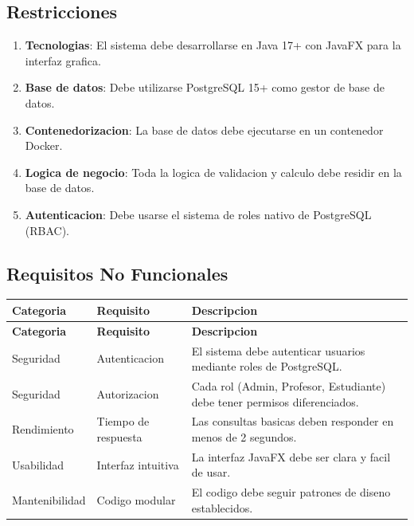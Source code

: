 \documentclass[12pt,a4paper]{article}
\begin{document}
\subsection{Restricciones}

\begin{enumerate}
    \item \textbf{Tecnologias}: El sistema debe desarrollarse en Java 17+ con JavaFX para la interfaz grafica.
    \item \textbf{Base de datos}: Debe utilizarse PostgreSQL 15+ como gestor de base de datos.
    \item \textbf{Contenedorizacion}: La base de datos debe ejecutarse en un contenedor Docker.
    \item \textbf{Logica de negocio}: Toda la logica de validacion y calculo debe residir en la base de datos.
    \item \textbf{Autenticacion}: Debe usarse el sistema de roles nativo de PostgreSQL (RBAC).
\end{enumerate}

\subsection{Requisitos No Funcionales}

\begin{longtable}{|p{3cm}|p{4cm}|p{7cm}|}
\hline
\rowcolor{udgreen!20}
\textbf{Categoria} & \textbf{Requisito} & \textbf{Descripcion} \\
\hline
\endfirsthead
\hline
\rowcolor{udgreen!20}
\textbf{Categoria} & \textbf{Requisito} & \textbf{Descripcion} \\
\hline
\endhead
Seguridad & Autenticacion & El sistema debe autenticar usuarios mediante roles de PostgreSQL. \\
\hline
Seguridad & Autorizacion & Cada rol (Admin, Profesor, Estudiante) debe tener permisos diferenciados. \\
\hline
Rendimiento & Tiempo de respuesta & Las consultas basicas deben responder en menos de 2 segundos. \\
\hline
Usabilidad & Interfaz intuitiva & La interfaz JavaFX debe ser clara y facil de usar. \\
\hline
Mantenibilidad & Codigo modular & El codigo debe seguir patrones de diseno establecidos. \\
\hline
\end{longtable}


\newpage
\end{document}
